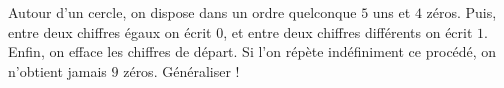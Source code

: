 Autour d'un cercle, on dispose dans un ordre quelconque $5$ uns et $4$ zéros. Puis, entre deux chiffres égaux on écrit $0$, et entre deux chiffres différents on écrit $1$. Enfin, on efface les chiffres de départ. Si l'on répète indéfiniment ce procédé, on n'obtient jamais $9$ zéros. Généraliser !
